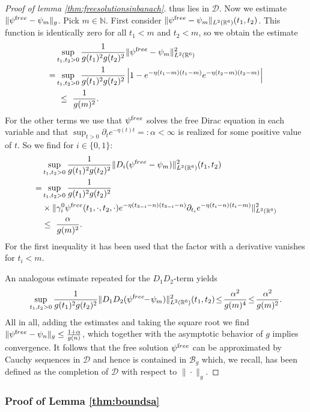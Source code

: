 \documentclass[b5paper,draft,openbib,12pt]{memoir}
\newcommand{\free}{{\textup free}}
\begin{document}
\begin{proof}[Proof of lemma \ref{thm:freesolutionsinbanach}]
 thus lies in \(\mathscr{D}\). Now we estimate
  \(\|\psi^\free-\psi_m\|_g\). Pick \(m\in\mathbb{N}\). First 
  consider \(\|\psi^\free -\psi_m\|_{L^2(\mathbb{R}^6)}(t_1,t_2)\). 
  This function is identically zero for all \(t_1<m\) and 
  \(t_2<m\), so we obtain the estimate
 \begin{align}
    & \sup_{t_1,t_2>0} \frac{1}{g(t_1)^2g(t_2)^2} \|\psi^\free- \psi_m\|^2_{L^2(\mathbb{R}^6)}\nonumber\\
     =&\sup_{t_1,t_2>0} \frac{1}{g(t_1)^2g(t_2)^2} \left|1-e^{-\eta(t_1-m)(t_1-m)}e^{-\eta(t_2-m)(t_2-m)}\right|\\
     & ~\le~\frac{1}{g(m)^2}.
\end{align}
For the other terms we use that \(\psi^\free\) solves the free Dirac 
equation in each variable and that 
\(\sup_{t>0}\partial_{t} e^{-\eta(t)t}=:\alpha<\infty\) is realized 
for some positive value of \(t\). So we find for \(i\in \{0,1\}\):
 \begin{align}
& \sup_{t_1,t_2>0}\frac{1}{g(t_1)^2g(t_2)^2}\|D_i (\psi^\free-\psi_m)\|^2_{L^2(\mathbb{R}^6)}(t_1,t_2)\nonumber\\
= &\sup_{t_1,t_2>0}\frac{1}{g(t_1)^2g(t_2)^2}
 \\
 &\times\|\gamma_{i}^0 \psi^\free(t_1,\cdot,t_2,\cdot) e^{-\eta(t_{3-i}-n)(t_{3-i}-n)}\partial_{t_i}e^{-\eta(t_i-n)(t_i-m)} \|^2_{L^2(\mathbb{R}^6)}\\
 &\le~ \frac{\alpha}{g(m)^2}.
 \end{align}
For the first inequality it has been used that the factor with a 
derivative vanishes for \(t_i<m\). 

An analogous estimate repeated for the \(D_1D_2\)-term yields
\begin{equation*}
     \sup_{t_1,t_2>0} \frac{1}{g(t_1)^2g(t_2)^2}\|D_1D_2(\psi^\free \!\!-\! \psi_m)\|^2_{L^2(\mathbb{R}^6)}(t_1,t_2)\!\le\! \frac{\alpha^2}{g(m)^4} \!\le\! \frac{\alpha^2}{g(m)^2}.
 \end{equation*}
All in all, adding the estimates and taking the square root we 
find \(\|\psi^\free - \psi_n\|_g \le \frac{1+\alpha}{g(n)}\), which 
together with the asymptotic behavior of \(g\) implies convergence. 
It follows that the free solution \(\psi^\free\) can be approximated 
by Cauchy sequences in \(\mathscr{D}\) and hence is contained in 
\(\mathscr{B}_g\) which, we recall, has been defined as the 
completion of $\mathscr{D}$ with respect to $\| \cdot \|_g$. 
\end{proof}


\subsubsection{Proof of Lemma \ref{thm:boundsa}} \label{sec:proofboundsa}
\end{document}

